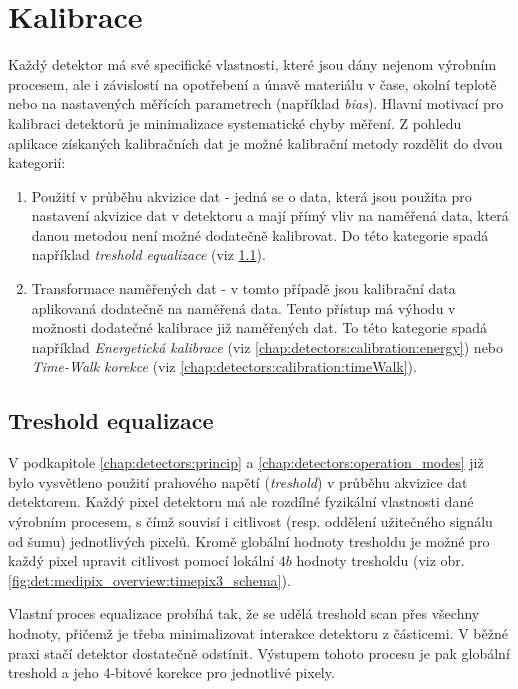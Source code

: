 \section{Kalibrace}\label{chap:detectors:calibration}
Každý detektor má své specifické vlastnosti, které jsou dány nejenom výrobním procesem, ale i závislostí na opotřebení a únavě materiálu v čase, okolní teplotě nebo na nastavených měřících parametrech (například \textit{bias}). Hlavní motivací pro kalibraci detektorů je minimalizace systematické chyby měření. Z pohledu aplikace získaných kalibračních dat je možné kalibrační metody rozdělit do dvou kategorií:
\begin{enumerate}[label=(\roman*)]
	\item Použití v průběhu akvizice dat - jedná se o data, která jsou použita pro nastavení akvizice dat v detektoru a mají přímý vliv na naměřená data, která danou metodou není možné dodatečně kalibrovat. Do této kategorie spadá například \textit{treshold equalizace} (viz \ref{chap:detectors:calibration:equalization}).
	\item Transformace naměřených dat - v tomto případě jsou kalibrační data aplikovaná dodatečně na naměřená data. Tento přístup má výhodu v možnosti dodatečné kalibrace již naměřených dat. To této kategorie spadá například \textit{Energetická kalibrace} (viz \ref{chap:detectors:calibration:energy}) nebo \textit{Time-Walk korekce} (viz \ref{chap:detectors:calibration:timeWalk}).
\end{enumerate}

\subsection{Treshold equalizace}\label{chap:detectors:calibration:equalization}
V podkapitole \ref{chap:detectors:princip} a \ref{chap:detectors:operation_modes} již bylo vysvětleno použití prahového napětí (\textit{treshold}) v průběhu akvizice dat detektorem. Každý pixel detektoru má ale rozdílné fyzikální vlastnosti dané výrobním procesem, s čímž souvisí i citlivost (resp. oddělení užitečného signálu od šumu) jednotlivých pixelů. Kromě globální hodnoty tresholdu je možné pro každý pixel upravit citlivost pomocí lokální $4b$ hodnoty tresholdu (viz obr. \ref{fig:det:medipix_overview:timepix3_schema}).

Vlastní proces equalizace probíhá tak, že se udělá treshold scan přes všechny hodnoty, přičemž je třeba minimalizovat interakce detektoru z částicemi. V běžné praxi stačí detektor dostatečně odstínit. Výstupem tohoto procesu je pak globální treshold a jeho 4-bitové korekce pro jednotlivé pixely.

